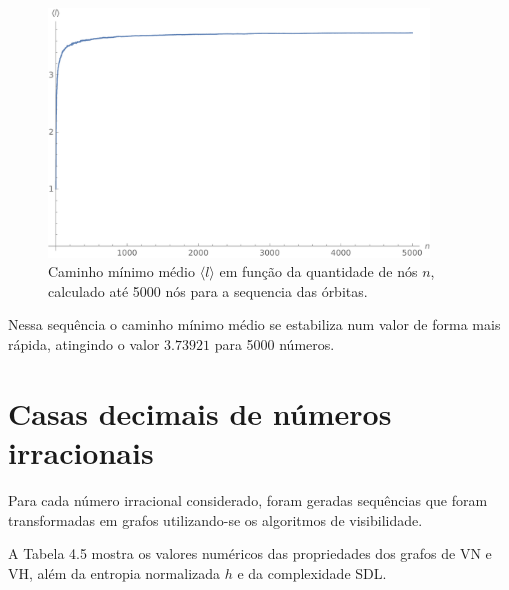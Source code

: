 \documentclass[12pt,a4paper,fleqn]{report}
\begin{document}
\begin{figure}[H]
    \centering
    \includegraphics[width=0.9\textwidth]{article-2/growth-orbits.pdf}
    \caption{Caminho mínimo médio $\langle l\rangle$ em função da quantidade de nós $n$, calculado até 5000 nós para a sequencia das órbitas.}
    \label{means}
\end{figure}

Nessa sequência o caminho mínimo médio se estabiliza num valor de forma mais rápida, atingindo o
valor $3.73921$ para 5000 números.


\section{Casas decimais de números irracionais}

Para cada número irracional considerado, foram geradas sequências que foram transformadas em
grafos utilizando-se os algoritmos de visibilidade.

A Tabela 4.5 mostra os valores numéricos das propriedades dos grafos de VN e VH, além da entropia normalizada $h$ e da complexidade SDL.
\end{document}
